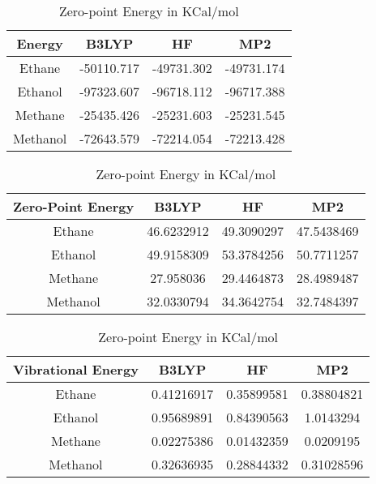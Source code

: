 \clearpage
\begin{table}[htbp]
\caption{Raw data obtained for Equation 1}\label{tab:reaction-1-raw}
\vspace*{1 cm}
\begin{subtable}[h]{\textwidth}
\centering
\begin{tabular}{|c|c|c|c|}
\hline
Energy & B3LYP      & HF         & MP2        \\ \hline
Ethane   & -50110.717 & -49731.302 & -49731.174 \\
Ethanol  & -97323.607 & -96718.112 & -96717.388 \\
Methane  & -25435.426 & -25231.603 & -25231.545 \\
Methanol & -72643.579 & -72214.054 & -72213.428 \\ \hline
\end{tabular}
\caption{Internal Energy in KCal/mol}
\end{subtable}
\vspace{\fill}
\begin{subtable}[h]{\textwidth}
\vspace*{1 cm}
\centering
\begin{tabular}{|c|c|c|c|}
\hline
Zero-Point Energy & B3LYP      & HF         & MP2        \\ \hline
Ethane   & 46.6232912 & 49.3090297 & 47.5438469 \\
Ethanol  & 49.9158309 & 53.3784256 & 50.7711257 \\
Methane  & 27.958036  & 29.4464873 & 28.4989487 \\
Methanol & 32.0330794 & 34.3642754 & 32.7484397 \\ \hline
\end{tabular}
\caption{Zero-point Energy in KCal/mol}
\end{subtable}
\vspace{\fill}
\begin{subtable}[h]{\textwidth}
\vspace*{1 cm}
\centering
\begin{tabular}{|c|c|c|c|}
\hline
Vibrational Energy & B3LYP      & HF         & MP2        \\ \hline
Ethane   & 0.41216917 & 0.35899581 & 0.38804821 \\
Ethanol  & 0.95689891 & 0.84390563 & 1.0143294  \\
Methane  & 0.02275386 & 0.01432359 & 0.0209195  \\
Methanol & 0.32636935 & 0.28844332 & 0.31028596 \\ \hline

\end{tabular}
\end{subtable}
\end{table}
